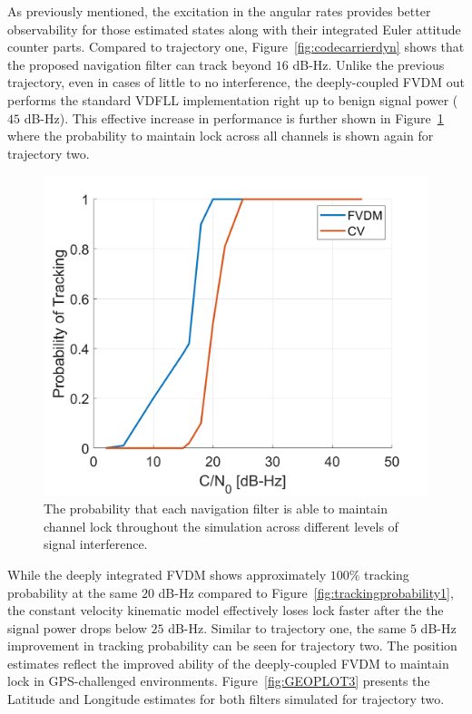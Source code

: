 As previously mentioned, the excitation in the angular rates provides better observability for those estimated states along with their integrated Euler attitude counter parts. Compared to trajectory one, Figure~\ref{fig:codecarrierdyn} shows that the proposed navigation filter can track beyond \(16\) dB-Hz. Unlike the previous trajectory, even in cases of little to no interference, the deeply-coupled FVDM out performs the standard VDFLL implementation right up to benign signal power (\(45\) dB-Hz). This effective increase in performance is further shown in Figure~\ref{fig:trackingprobability2} where the probability to maintain lock across all channels is shown again for trajectory two.

\begin{figure}[!ht]
    \centering
    \includegraphics[width=0.5\linewidth]{Figures/dynamic/trackingprobdyn.png}
    \caption{The probability that each navigation filter is able to maintain channel lock throughout the simulation across different levels of signal interference.}\label{fig:trackingprobability2}
\end{figure}

While the deeply integrated FVDM shows approximately \(100\% \) tracking probability at the same \(20\) dB-Hz compared to Figure~\ref{fig:trackingprobability1}, the constant velocity kinematic model effectively loses lock faster after the the signal power drops below \(25\) dB-Hz. Similar to trajectory one, the same \(5\) dB-Hz improvement in tracking probability can be seen for trajectory two. The position estimates reflect the improved ability of the deeply-coupled FVDM to maintain lock in GPS-challenged environments. Figure~\ref{fig:GEOPLOT3} presents the Latitude and Longitude estimates for both filters simulated for trajectory two.

